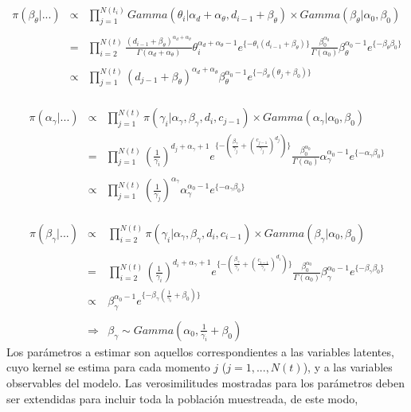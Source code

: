 \\
\begin{eqnarray*}
\pi(\beta_\theta|...)&\propto&\prod_{j=1}^{N(t_i)} Gamma(\theta_i|\alpha_d+\alpha_\theta,d_{i-1}+\beta_\theta)\times Gamma(\beta_\theta|\alpha_0,\beta_0)\\
\\
&=&\prod_{i=2}^{N(t)}\frac{(d_{i-1}+\beta_\theta)^{\alpha_d+\alpha_\theta}}{\Gamma(\alpha_d+\alpha_\theta)} \theta_i^{\alpha_d+\alpha_\theta-1} e^{\{-\theta_i(d_{i-1}+\beta_\theta)\}}\frac{\beta_0^{\alpha_0}}{\Gamma(\alpha_0)} \beta_\theta^{\alpha_0-1}e^{\{-\beta_\theta\beta_0\}}\\
\\
&\propto&\prod_{j=1}^{N(t)}(d_{j-1}+\beta_\theta)^{\alpha_d+\alpha_\theta}\beta_\theta^{\alpha_0-1} e^{\{-\beta_\theta(\theta_j+\beta_0)\}}
\end{eqnarray*}
\\
\begin{eqnarray*}
\pi(\alpha_\gamma|...)&\propto&\prod_{j=1}^{N(t)} \pi(\gamma_i|\alpha_\gamma,\beta_\gamma,d_i,c_{j-1})\times Gamma(\alpha_\gamma|\alpha_0,\beta_0)\\
&=&\prod_{j=1}^{N(t)}(\frac{1}{\gamma_i})^{d_j+\alpha_\gamma+1}e^{\{-(\frac{\beta_\gamma}{\gamma_j}+(\frac{c_{j-1}}{\gamma_j})^{d_j})\}}\frac{\beta_0^{\alpha_0}}{\Gamma(\alpha_0)} \alpha_\gamma^{\alpha_0-1}e^{\{-\alpha_\gamma\beta_0\}}\\
\\
&\propto&\prod_{j=1}^{N(t)} (\frac{1}{\gamma_j})^{\alpha_\gamma}\alpha_\gamma^{\alpha_0-1}e^{\{-\alpha_\gamma\beta_0\}}
\end{eqnarray*}
\\
\begin{eqnarray*}
\pi(\beta_\gamma|...)&\propto&\prod_{i=2}^{N(t)} \pi(\gamma_i|\alpha_\gamma,\beta_\gamma,d_i,c_{i-1})\times Gamma(\beta_\gamma|\alpha_0,\beta_0)\\
\\
&=&\prod_{i=2}^{N(t)}(\frac{1}{\gamma_i})^{d_i+\alpha_\gamma+1}e^{\{-(\frac{\beta_\gamma}{\gamma_i}+(\frac{c_{i-1}}{\gamma_i})^{d_i})\}}\frac{\beta_0^{\alpha_0}}{\Gamma(\alpha_0)} \beta_\gamma^{\alpha_0-1}e^{\{-\beta_\gamma\beta_0\}}\\
&\propto&\beta_\gamma^{\alpha_0-1}e^{\{-\beta_\gamma(\frac{1}{\gamma_i}+\beta_0)\}}\\
\\
&\Rightarrow& \beta_\gamma \sim Gamma(\alpha_0,\frac{1}{\gamma_i}+\beta_0)
\end{eqnarray*}
Los par\'ametros a estimar son aquellos correspondientes a las variables latentes, cuyo kernel se estima para cada momento $j$ ($j=1,...,N(t)$), y a las variables observables del modelo. Las verosimilitudes mostradas para los par\'ametros deben ser extendidas para incluir toda la poblaci\'on muestreada, de este modo,%
